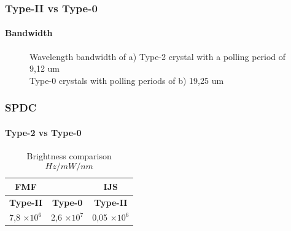 \documentclass[serif,8pt]{beamer}
\begin{document}
{{\begin{frame}[t]
	\frametitle{Type-II vs Type-0}
	\framesubtitle{Bandwidth}
	
	\begin{figure}[!ht]
	  \centering
	  \caption{Wavelength bandwidth of a) Type-2 crystal with a polling period of 9,12 um\\ Type-0 crystals with polling periods of b) 19,25 um}
	  \quad
	  \pause
	  \label{fig:CompT0a2}
	\end{figure}
\end{frame}

\begin{frame}
	\frametitle{SPDC}
	\framesubtitle{Type-2 vs Type-0}

	\begin{table}
		\begin{center}
		\caption{Brightness comparison \[Hz/mW/nm\]}
			\begin{tabular}[c|c|c]{|ll|l|}
				\hline
				\multicolumn{1}{|c}{\textbf{FMF}} & & 
				\multicolumn{1}{c|}{\textbf{IJS}} \\
				\hline 
				\multicolumn{1}{|c|}{\textbf{Type-II}} &
				\multicolumn{1}{c|}{\textbf{Type-0}} &
				\multicolumn{1}{c|}{\textbf{Type-II}} \\
				\hline
				7,8 $\times10^6$ & 2,6 $\times 10^7 $ & 0,05 $\times 10^6 $\\
				\hline
			\end{tabular}
		\end{center}
	\end{table}
\end{frame}

}}
\end{document}
